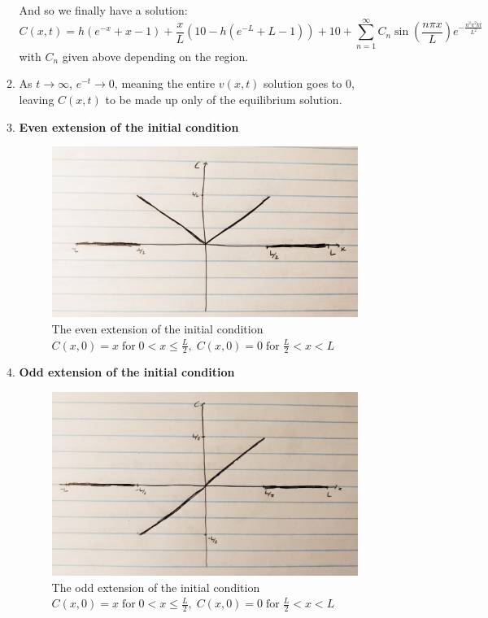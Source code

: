 \documentclass[12pt]{article}
\begin{document}
\begin{enumerate}
\begin{enumerate}
            And so we finally have a solution:
            \begin{equation*}
                C(x,t)=h(e^{-x}+x-1)+\frac{x}{L}(10-h(e^{-L}+L-1))+10 + \sum_{n=1}^\infty C_n\sin(\frac{n\pi x}{L})e^{-\frac{n^2\pi^2kt}{L^2}}
            \end{equation*}
            with $C_n$ given above depending on the region.

            \item As $t\rightarrow\infty$, $e^{-t}\rightarrow 0$, meaning the entire $v(x,t)$ solution goes to
            0, leaving $C(x,t)$ to be made up only of the equilibrium solution.

            \item \textbf{Even extension of the initial condition}
            \begin{figure}[H]
                \begin{center}
                   \includegraphics[width=.65\textwidth]{EvenExtension.jpg}
                   \caption{The even extension of the initial condition $C(x,0)=x\;\text{for}\; 0<x\leq\frac{L}{2},\;C(x,0)=0\;\text{for}\; \frac{L}{2}<x<L$}
                   \label{fig:EvenExtension}
                \end{center}
            \end{figure}

            \item \textbf{Odd extension of the initial condition}
            \begin{figure}[H]
                \begin{center}
                   \includegraphics[width=.65\textwidth]{OddExtension.jpg}
                   \caption{The odd extension of the initial condition $C(x,0)=x\;\text{for}\; 0<x\leq\frac{L}{2},\;C(x,0)=0\;\text{for}\; \frac{L}{2}<x<L$}
                   \label{fig:OddExtension}
                \end{center}
            \end{figure}            
        

\end{enumerate}
\end{enumerate}
\end{document}
